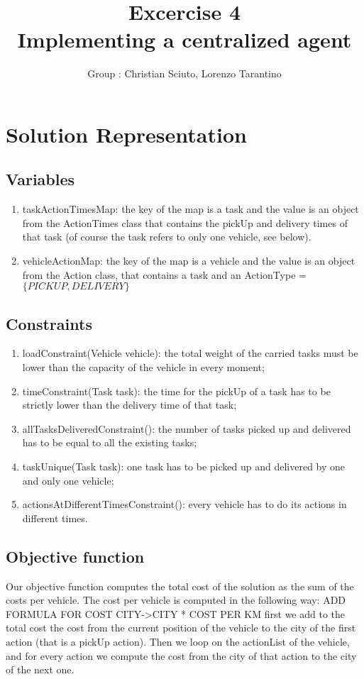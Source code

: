 \documentclass[11pt]{article}
\title{\bf Excercise 4\\ Implementing a centralized agent}
\author{Group \textnumero{15} : Christian Sciuto, Lorenzo Tarantino}
\begin{document}
\maketitle

\section{Solution Representation}

\subsection{Variables}
\begin{enumerate}
\item taskActionTimesMap: the key of the map is a task and the value is an object from the ActionTimes class that contains the pickUp and delivery times of that task (of course the task refers to only one vehicle, see below).
\item vehicleActionMap: the key of the map is a vehicle and the value is an object from the Action class, that contains a task and an ActionType = $\{PICKUP, DELIVERY\}$
\end{enumerate}

\subsection{Constraints}
\begin{enumerate}
\item loadConstraint(Vehicle vehicle): the total weight of the carried tasks must be lower than the capacity of the vehicle in every moment;
\item timeConstraint(Task task): the time for the pickUp of a task has to be strictly lower than the delivery time of that task;
\item allTasksDeliveredConstraint(): the number of tasks picked up and delivered has to be equal to all the existing tasks;
\item taskUnique(Task task): one task has to be picked up and delivered by one and only one vehicle;
\item actionsAtDifferentTimesConstraint(): every vehicle has to do its actions in different times.
\end{enumerate}

\subsection{Objective function}
Our objective function computes the total cost of the solution as the sum of the costs per vehicle. The cost per vehicle is computed in the following way: ADD FORMULA FOR COST CITY->CITY * COST PER KM first we add to the total cost the cost from the current position of the vehicle to the city of the first action (that is a pickUp action). Then we loop on the actionList of the vehicle, and for every action we compute the cost from the city of that action to the city of the next one.
\end{document}
